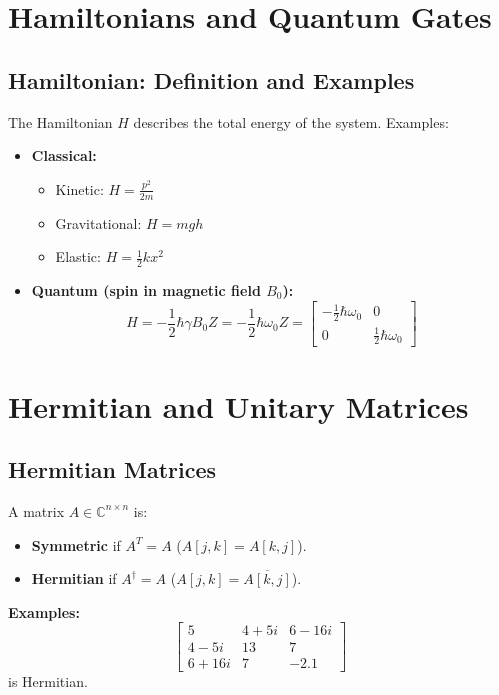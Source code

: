 \documentclass{book}
\begin{document}
\section{Hamiltonians and Quantum Gates}

\subsection*{Hamiltonian: Definition and Examples}
The Hamiltonian $H$ describes the total energy of the system. Examples:
\begin{itemize}
    \item \textbf{Classical:}
        \begin{itemize}
            \item Kinetic: $H = \frac{p^2}{2m}$
            \item Gravitational: $H = mgh$
            \item Elastic: $H = \frac{1}{2}kx^2$
        \end{itemize}
    \item \textbf{Quantum (spin in magnetic field $B_0$):}
    \[
    H = -\frac{1}{2}\hbar\gamma B_0 Z = -\frac{1}{2}\hbar\omega_0 Z =
    \begin{bmatrix}
    -\frac{1}{2}\hbar\omega_0 & 0 \\
    0 & \frac{1}{2}\hbar\omega_0
    \end{bmatrix}
    \]
\end{itemize}

\section{Hermitian and Unitary Matrices}

\subsection*{Hermitian Matrices}
A matrix $A \in \mathbb{C}^{n \times n}$ is:
\begin{itemize}
    \item \textbf{Symmetric} if $A^T = A$ ($A[j,k] = A[k,j]$).
    \item \textbf{Hermitian} if $A^\dagger = A$ ($A[j,k] = \overline{A[k,j]}$).
\end{itemize}
\textbf{Examples:}
\[
\begin{bmatrix}
5 & 4+5i & 6-16i \\
4-5i & 13 & 7 \\
6+16i & 7 & -2.1
\end{bmatrix}
\]
is Hermitian.
\end{document}
